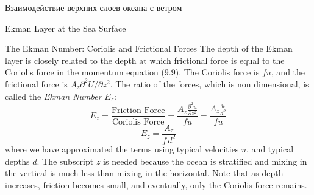 \begin{chapter}{Взаимодействие верхних слоев океана с ветром}
\begin{section}{Ekman Layer at the Sea Surface}
\begin{paragraph}{The Ekman Number: Coriolis and Frictional Forces}
The depth of the Ekman layer is closely related to the depth at which
frictional force is equal to the Coriolis force
in the momentum equation (9.9). The Coriolis force is $f u$, and the
frictional force is $A_z \partial^2 U/\partial z^2$. The ratio of the
forces, which is non dimensional, is called the \textit{Ekman
Number} $E_z$:
\begin{displaymath}
 E_z= \frac{\text{Friction Force}}{\text{Coriolis Force}} 
    = \frac{A_z\frac{\partial^2u}{\partial{z^2}}}{fu} 
    = \frac{A_z\frac{u}{d^2}}{fu}
\end{displaymath}
\begin{equation}
 \boxed{E_z = \frac{A_z}{f\,d^2}}
\end{equation}
where we have approximated the terms using typical velocities $u$, and
typical depths $d$. The subscript $z$ is needed because the ocean is
stratified and mixing in the vertical is much less than mixing in the
horizontal. Note that as depth increases, friction becomes small, and
eventually, only the Coriolis force remains.
%


\end{paragraph}
\end{section}
\end{chapter}
